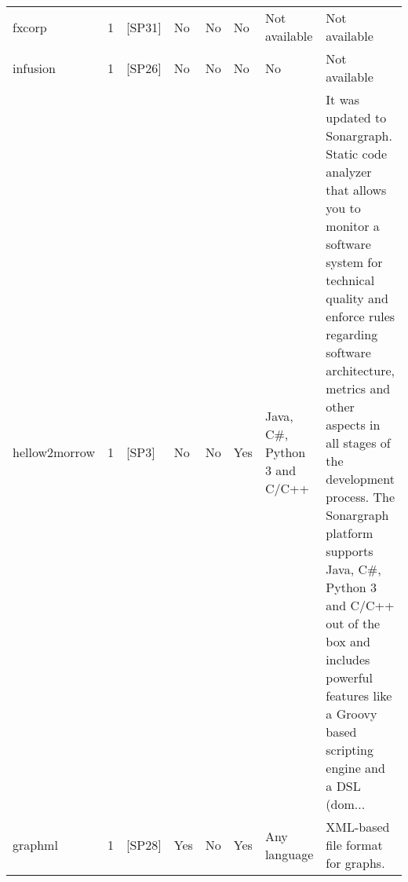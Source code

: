 \begin{tabular}{lrllllll}
              fxcorp &      1 &                                                 [SP31] &    No &       No &        No &                                                                                                                                                                           Not available &                                                                                                                                                                                                                                                                                                                                                                                                    Not available \\
            infusion &      1 &                                                 [SP26] &    No &       No &        No &                                                                                                                                                                                      No &                                                                                                                                                                                                                                                                                                                                                                                                    Not available \\
       hellow2morrow &      1 &                                                  [SP3] &    No &       No &       Yes &                                                                                                                                                            Java, C\#, Python 3 and C/C++ &  It was updated to Sonargraph. Static code analyzer that allows you to monitor a software system for technical quality and enforce rules regarding software architecture, metrics and other aspects in all stages of the development process. The Sonargraph platform supports Java, C\#, Python 3 and C/C++ out of the box and includes powerful features like a Groovy based scripting engine and a DSL (dom... \\
             graphml &      1 &                                                 [SP28] &   Yes &       No &       Yes &                                                                                                                                                                            Any language &                                                                                                                                                                                                                                                                                                                                                                                XML-based file format for graphs. \\

\end{tabular}
